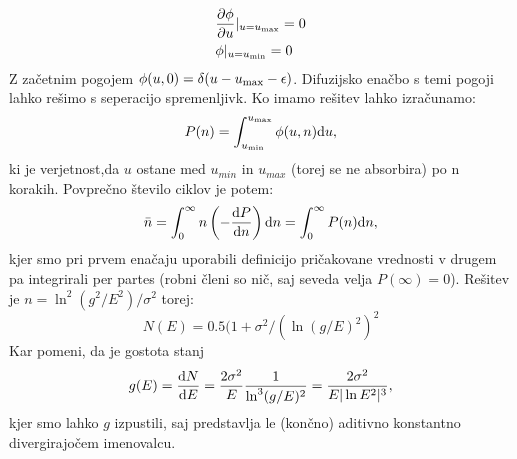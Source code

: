 \begin{align}
& \frac{\partial \phi}{\partial u} \vert_{u = u_{\textup{max}}} = 0 \\
& \phi \vert_{u = u_{\textup{min}}} = 0
\end{align}
Z začetnim pogojem $\phi (u, 0) = \delta ( u - u_{\textup{max}} - \epsilon)$.
Difuzijsko enačbo s temi pogoji lahko rešimo s seperacijo spremenljivk.
Ko imamo rešitev lahko izračunamo:
\begin{equation}
P(n) = \int_{u_{\textup{min}}}^{u_{\textup{max}}} \phi(u,n) \textup{d} u,
\end{equation}
ki je verjetnost,da $u$ ostane med $u_{min}$ in $u_{max}$ (torej se ne absorbira) po n korakih.
Povprečno število ciklov je potem:
\begin{equation}
\bar{n} = \int_0^\infty n \left( - \frac{ \textup{d} P}{\textup{d} n} \right) \textup{d} n = \int_0^\infty P(n) \textup{d} n,
\end{equation}
kjer smo pri prvem enačaju uporabili definicijo pričakovane vrednosti v drugem pa integrirali per partes (robni členi so nič, saj seveda velja $P(\infty) = 0$).
Rešitev je $n =  \ln^2(g^2/E^2) / \sigma^2$ torej:
\begin{equation}
N(E) = 0.5 (1 + \sigma^2 / (\ln (g/E)^2)^2
\end{equation}
Kar pomeni, da je gostota stanj
\begin{equation}
g(E) = \frac{\textup{d} N}{\textup{d} E} = \frac{2 \sigma^2}{E} \frac{1}{\ln^3 (g/E)^2} = \frac{2 \sigma^2}{E |\ln E^2|^3},
\end{equation}
kjer smo lahko $g$ izpustili, saj predstavlja le (končno) aditivno konstantno divergirajočem imenovalcu.

